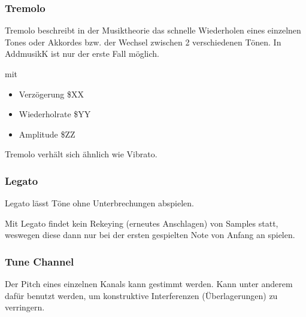 \subsubsection{Tremolo}

Tremolo beschreibt in der Musiktheorie das schnelle Wiederholen eines einzelnen Tones oder Akkordes bzw. der Wechsel zwischen 2 verschiedenen Tönen. In AddmusikK ist nur der erste Fall möglich.

\medskip



\medskip

mit

\begin{itemize}
	\item Verzögerung \$XX
	\item Wiederholrate \$YY
	\item Amplitude \$ZZ
\end{itemize}

Tremolo verhält sich ähnlich wie Vibrato.


\subsubsection{Legato}

Legato lässt Töne ohne Unterbrechungen abspielen.

\medskip



\medskip

Mit Legato findet kein Rekeying (erneutes Anschlagen) von Samples statt, weswegen diese dann nur bei der ersten gespielten Note von Anfang an spielen.


\subsubsection{Tune Channel}

Der Pitch eines einzelnen Kanals kann gestimmt werden. Kann unter anderem dafür benutzt werden, um konstruktive Interferenzen (Überlagerungen) zu verringern.

\medskip



